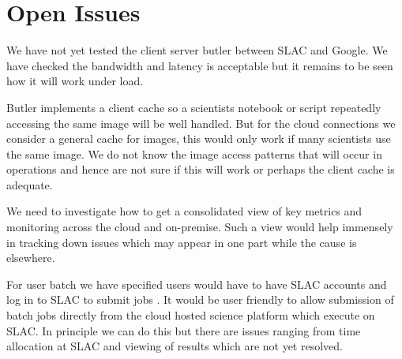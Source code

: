 \section{Open Issues} \label{sec:open}

We have not yet tested the client server butler between SLAC and Google.
We have checked the bandwidth and latency is acceptable but it remains to be seen how it will work under load.

Butler implements a client cache  so a scientists notebook or script  repeatedly accessing the same image will be well handled.
But for the cloud connections we consider a general cache for images,  this would only work if many scientists use the same image.
We do not know the image access patterns that will occur in operations and hence are not sure if this will work or perhaps the client cache is adequate.


We need to investigate how to get a  consolidated view of key metrics and monitoring across the cloud and on-premise.
Such a view would help immensely in tracking down issues which may appear in one part while the cause is elsewhere.

For user batch we have specified users would have to have SLAC accounts and log in to SLAC to submit jobs \cite{DMTN-223}.
It would be user friendly to allow submission of batch jobs directly from the cloud hosted science platform which execute on SLAC.
In principle we can do this but there are issues ranging from time allocation at SLAC and viewing of results which are not yet resolved.


~
